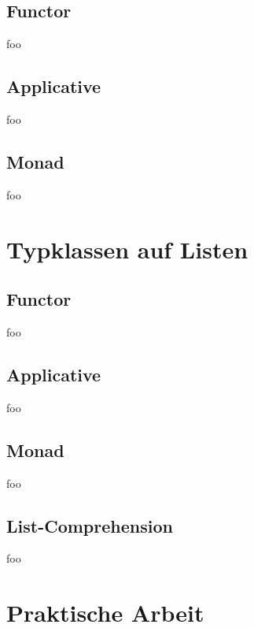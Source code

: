 \documentclass{beamer}
\begin{document}
\subsection{Functor}
\begin{frame}
 foo
\end{frame}

\subsection{Applicative}
\begin{frame}
 foo
\end{frame}

\subsection{Monad}
\begin{frame}
 foo
\end{frame}

\section{Typklassen auf Listen}
\subsection{Functor}
\begin{frame}
 foo
\end{frame}

\subsection{Applicative}
\begin{frame}
 foo
\end{frame}

\subsection{Monad}
\begin{frame}
 foo
\end{frame}

\subsection{List-Comprehension}
\begin{frame}
 foo
\end{frame}

\section{Praktische Arbeit}
\end{document}
